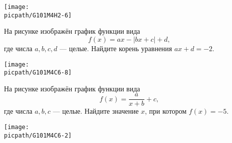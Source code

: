 \begin{class}[number=6]
\begin{listofex}
		\begin{minipage}[t]{\picwidth}
			\texttt{[image: \\picpath/G101M4H2-6]}
		\end{minipage}
		\item
		\begin{minipage}[t]{\bodywidth}
			На рисунке изображён график функции вида \[ f(x)=ax-|bx+c|+d, \] где числа \(a, b, c, d\) --- целые. Найдите корень уравнения \(ax+d=-2\).
		\end{minipage}
		\hspace{0.02\linewidth}
		\begin{minipage}[t]{\picwidth}
			\texttt{[image: \\picpath/G101M4C6-8]}
		\end{minipage}
		\item
		\begin{minipage}[t]{\bodywidth}
			На рисунке изображён график функции вида \[ f(x)=\dfrac{a}{x+b}+c, \] где числа \(a, b, c\) --- целые. Найдите значение \(x\), при котором \(f(x)=-5\).
		\end{minipage}
		\hspace{0.02\linewidth}
		\begin{minipage}[t]{\picwidth}
			\texttt{[image: \\picpath/G101M4C6-2]}
		\end{minipage}

\end{listofex}
\end{class}
